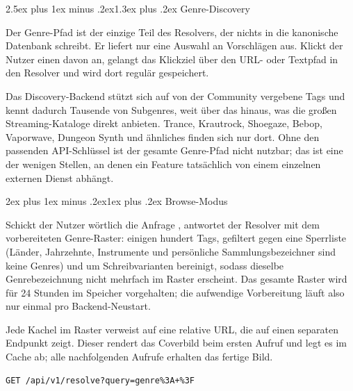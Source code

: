 \documentclass[11pt,a4paper]{article}
\makeatletter
\renewcommand{\section}{\@startsection{section}{1}{0pt}%
  {2.5ex plus 1ex minus .2ex}{1.3ex plus .2ex}%
  {\Large\bfseries\itshape}}
\renewcommand{\subsection}{\@startsection{subsection}{2}{0pt}%
  {2ex plus 1ex minus .2ex}{1ex plus .2ex}%
  {\large\bfseries\itshape}}
\newcommand{\code}[1]{\codebox{\footnotesize\ttfamily #1}}
\makeatother
\begin{document}
\section{Genre-Discovery}

Der Genre-Pfad ist der einzige Teil des Resolvers, der nichts in
die kanonische Datenbank schreibt. Er liefert nur eine Auswahl an
Vorschlägen aus. Klickt der Nutzer einen davon an, gelangt das
Klickziel über den URL- oder Textpfad in den Resolver und wird
dort regulär gespeichert.

Das Discovery-Backend stützt sich auf von der Community vergebene
Tags und kennt dadurch Tausende von Subgenres, weit über das hinaus,
was die großen Streaming-Kataloge direkt anbieten. Trance,
Krautrock, Shoegaze, Bebop, Vaporwave, Dungeon Synth und
ähnliches finden sich nur dort. Ohne den passenden API-Schlüssel
ist der gesamte Genre-Pfad nicht nutzbar; das ist eine der
wenigen Stellen, an denen ein Feature tatsächlich von einem
einzelnen externen Dienst abhängt.

\subsection{Browse-Modus}

Schickt der Nutzer wörtlich die Anfrage \code{genre: ?}, antwortet
der Resolver mit dem vorbereiteten Genre-Raster: einigen hundert
Tags, gefiltert gegen eine Sperrliste (Länder, Jahrzehnte,
Instrumente und persönliche Sammlungsbezeichner sind keine
Genres) und um Schreibvarianten bereinigt, sodass dieselbe
Genrebezeichnung nicht mehrfach im Raster erscheint. Das gesamte
Raster wird für 24 Stunden im Speicher vorgehalten; die
aufwendige Vorbereitung läuft also nur einmal pro Backend-Neustart.

Jede Kachel im Raster verweist auf eine relative URL, die auf
einen separaten Endpunkt zeigt. Dieser rendert das Coverbild
beim ersten Aufruf und legt es im Cache ab; alle nachfolgenden
Aufrufe erhalten das fertige Bild.

\begin{codeFrame}\footnotesize
\begin{verbatim}
GET /api/v1/resolve?query=genre%3A+%3F
\end{verbatim}
\end{codeFrame}
\end{document}
